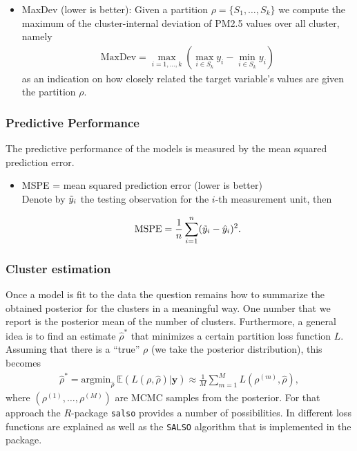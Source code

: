 \documentclass[12pt,a4paper]{article}
\begin{document}
\begin{itemize}
    \item MaxDev (lower is better): Given a partition $\rho
    = \{S_1, \ldots, S_k\}$ we compute the maximum of the cluster-internal 
    deviation of PM2.5 values over all cluster, namely
    \begin{align*}
        \text{MaxDev} = \max_{i=1, \ldots, k} \left(\max_{i\in S_k} y_i - 
        \min_{i\in S_k} y_i
         \right)
    \end{align*}
    as an indication on how closely related the target variable's
    values are given the partition $\rho$.
    

\end{itemize}

\subsubsection{Predictive Performance}

The predictive performance of the models is measured by the mean squared prediction error. \medskip

\begin{itemize}
    \item MSPE = mean squared prediction error (lower is better)\\
    Denote by $\Tilde{y}_i$ the testing observation for the $i$-th measurement unit, then

    \begin{align*}
        \text{MSPE} = \frac{1}{n} \sum_{i=1}^n (\Tilde{y}_i - \hat{y}_i)^2.
    \end{align*}
    
\end{itemize}

\subsubsection{Cluster estimation}
Once a model is fit to the data the question remains how to summarize the obtained posterior for the clusters in a meaningful way. One number that we report is the posterior mean of the number of clusters. Furthermore, a general idea is to find an estimate $\hat{\rho}^*$ that minimizes a certain partition loss function $L$. Assuming that there is a ``true'' $\rho$ (we take the posterior distribution), this becomes
\begin{align*}
    \hat{\rho}^* = \text{argmin}_{\hat{\rho}} \ \mathbb{E} ( L(\rho, \hat{\rho}) | \mathbf{y} ) \approx \frac{1}{M} \sum_{m=1}^M L (\rho^{(m)} , \hat{\rho} ),
\end{align*}
where $\left( \rho^{(1)}, \dots , \rho^{(M)} \right)$ are MCMC samples from the posterior. For that approach the $R$-package \texttt{salso} \cite{salso} provides a number of possibilities. In \cite{Dahl2022-salso} different loss functions are explained as well as the \texttt{SALSO} algorithm that is implemented in the package. \medskip
\end{document}

